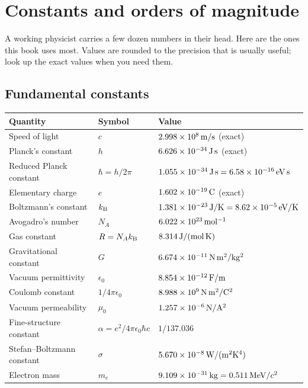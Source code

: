 \chapter{Constants and orders of magnitude}
\label{app:constants}

A working physicist carries a few dozen numbers in their head. Here are the ones this book uses most. Values are rounded to the precision that is usually useful; look up the exact values when you need them.

\section*{Fundamental constants}

\begin{center}
\small
\renewcommand{\arraystretch}{1.2}
\begin{tabular}{@{}l l l@{}}
\toprule
\textbf{Quantity} & \textbf{Symbol} & \textbf{Value}\\
\midrule
Speed of light & $c$ & $2.998\times10^{8}\,\mathrm{m/s}$ (exact)\\
Planck's constant & $h$ & $6.626\times10^{-34}\,\mathrm{J\,s}$ (exact)\\
Reduced Planck constant & $\hbar = h/2\pi$ & $1.055\times10^{-34}\,\mathrm{J\,s} = 6.58\times10^{-16}\,\mathrm{eV\,s}$\\
Elementary charge & $e$ & $1.602\times10^{-19}\,\mathrm{C}$ (exact)\\
Boltzmann's constant & $k_{\mathrm{B}}$ & $1.381\times10^{-23}\,\mathrm{J/K} = 8.62\times10^{-5}\,\mathrm{eV/K}$\\
Avogadro's number & $N_A$ & $6.022\times10^{23}\,\mathrm{mol^{-1}}$\\
Gas constant & $R = N_Ak_{\mathrm{B}}$ & $8.314\,\mathrm{J/(mol\,K)}$\\
Gravitational constant & $G$ & $6.674\times10^{-11}\,\mathrm{N\,m^2/kg^2}$\\
Vacuum permittivity & $\epsilon_0$ & $8.854\times10^{-12}\,\mathrm{F/m}$\\
Coulomb constant & $1/4\pi\epsilon_0$ & $8.988\times10^{9}\,\mathrm{N\,m^2/C^2}$\\
Vacuum permeability & $\mu_0$ & $1.257\times10^{-6}\,\mathrm{N/A^2}$\\
Fine-structure constant & $\alpha = e^2/4\pi\epsilon_0\hbar c$ & $1/137.036$\\
Stefan--Boltzmann constant & $\sigma$ & $5.670\times10^{-8}\,\mathrm{W/(m^2K^4)}$\\
\midrule
Electron mass & $m_e$ & $9.109\times10^{-31}\,\mathrm{kg} = 0.511\,\mathrm{MeV}/c^2$\\

\end{tabular}
\end{center}
